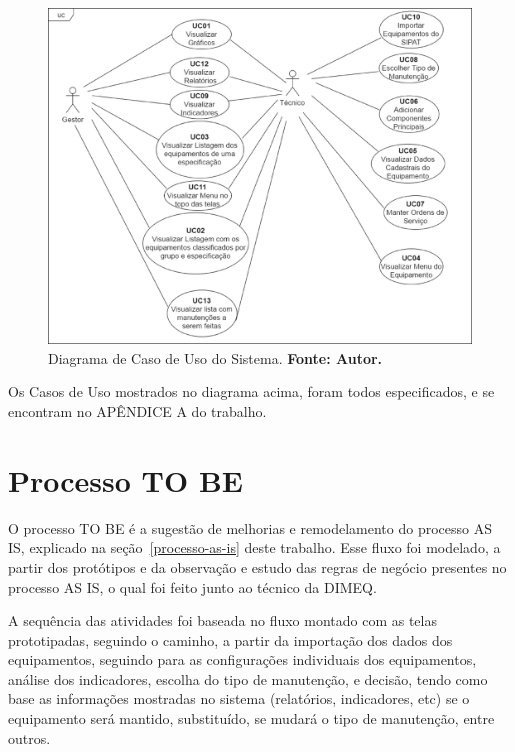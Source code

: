 \graphicspath{{figuras/}}
\begin{figure}[H]
\centering
\includegraphics[width=1.0\textwidth]{diagrama-de-caso-de-uso}
\caption{Diagrama de Caso de Uso do Sistema. \textbf{Fonte: Autor.}}
\label{diagrama-de-caso-de-uso}
\end{figure}

Os Casos de Uso mostrados no diagrama acima, foram todos especificados, e se encontram no APÊNDICE A do trabalho.


\pagebreak

\section{Processo TO BE}
\label{to-be}

O processo TO BE é a sugestão de melhorias e remodelamento do processo AS IS, explicado na seção~\ref{processo-as-is} deste trabalho. Esse fluxo foi modelado, a partir dos protótipos e da observação e estudo das regras de negócio presentes no processo AS IS, o qual foi feito junto ao técnico da DIMEQ. 

A sequência das atividades foi baseada no fluxo montado com as telas prototipadas, seguindo o caminho, a partir da importação dos dados dos equipamentos, seguindo para as configurações individuais dos equipamentos, análise dos indicadores, escolha do tipo de manutenção, e decisão, tendo como base as informações mostradas no sistema (relatórios, indicadores, etc) se o equipamento será mantido, substituído, se mudará o tipo de manutenção, entre outros.

